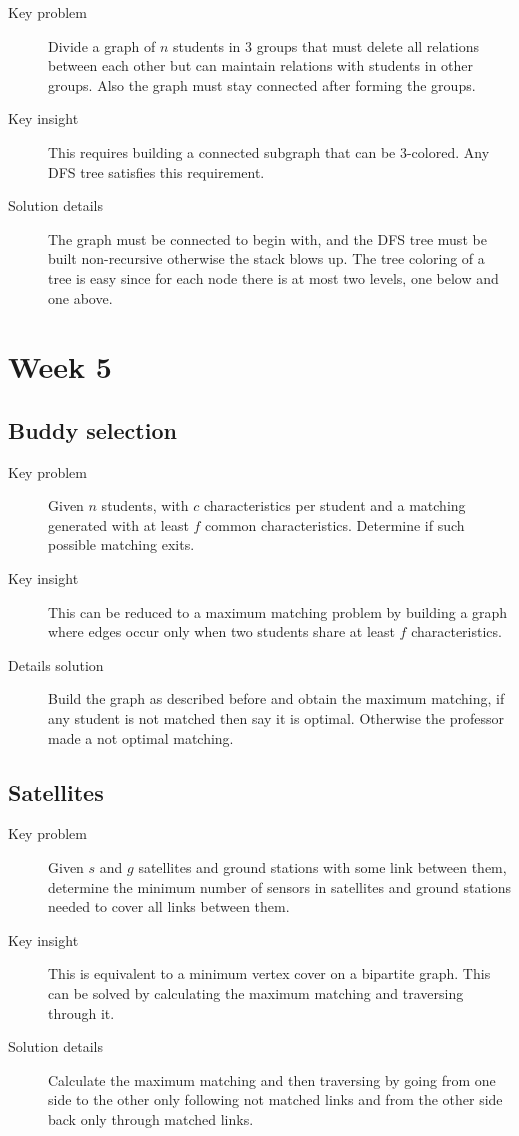 \documentclass[11pt]{book}
\begin{document}
\begin{description}
	\item[Key problem] Divide a graph of $n$ students in 3 groups that must delete all relations between each other but can maintain relations with students in other groups. Also the graph must stay connected after forming the groups.
	\item[Key insight] This requires building a connected subgraph that can be 3-colored. Any DFS tree satisfies this requirement.
	\item[Solution details] The graph must be connected to begin with, and the DFS tree must be built non-recursive otherwise the stack blows up. The tree coloring of a tree is easy since for each node there is at most two levels, one below and one above.
\end{description}

\section{Week 5}

\subsection{Buddy selection}

\begin{description}
	\item[Key problem] Given $n$ students, with $c$ characteristics per student and a matching generated with at least $f$ common characteristics. Determine if such possible matching exits.
	\item[Key insight] This can be reduced to a maximum matching problem by building a graph where edges occur only when two students share at least $f$ characteristics.
	\item[Details solution] Build the graph as described before and obtain the maximum matching, if any student is not matched then say it is optimal. Otherwise the professor made a not optimal matching.
\end{description}

\subsection{Satellites}

\begin{description}
	\item[Key problem] Given $s$ and $g$ satellites and ground stations with some link between them, determine the minimum number of sensors in satellites and ground stations needed to cover all links between them.
	\item[Key insight] This is equivalent to a minimum vertex cover on a bipartite graph. This can be solved by calculating the maximum matching and traversing through it.
	\item[Solution details] Calculate the maximum matching and then traversing by going from one side to the other only following not matched links and from the other side back only through matched links.
\end{description}
\end{document}
